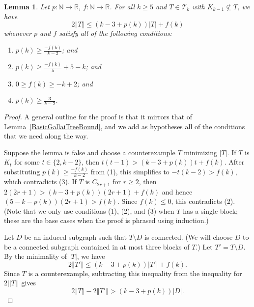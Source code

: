 \documentclass[12pt]{article}
\theoremstyle{plain}
\newtheorem{lem}[thm]{Lemma}
\theoremstyle{definition}
\theoremstyle{remark}
\newcommand{\fancy}[1]{\mathcal{#1}}
\newcommand{\IN}{\mathbb{N}}
\newcommand{\IR}{\mathbb{R}}
\newcommand{\T}{\fancy{T}}
\newcommand{\set}[1]{\left\{ #1 \right\}}
\newcommand{\card}[1]{\left|#1\right|}
\newcommand{\size}[1]{\left\Vert#1\right\Vert}
\newcommand{\func}[3]{#1\colon #2 \rightarrow #3}
\newcommand{\parens}[1]{\left( #1 \right)}
\begin{document}
\begin{lem}\label{BoundFamilyWithoutKKMinusOne}
	Let $\func{p}{\IN}{\IR}$, $\func{f}{\IN}{\IR}$.
	For all $k \ge 5$ and $T \in \T_k$ with $K_{k-1} \not \subseteq T$, we have
	\[2\size{T} \le (k-3 + p(k))\card{T} + f(k)\]
	whenever $p$ and $f$ satisfy all of the following conditions:
	\begin{enumerate}
		\item $p(k) \ge \frac{-f(k)}{k-2}$; and
		\item $p(k) \ge \frac{-f(k)}{5} + 5 - k$; and
		\item $0\ge f(k)\ge -k+2$; and
		\item $p(k) \ge \frac{3}{k-2}$.
	\end{enumerate}
\end{lem}
\begin{proof}
A general outline for the proof is that it mirrors that of
Lemma~\ref{BasicGallaiTreeBound}, and we add as hypotheses all of the conditions that
we need along the way.

Suppose the lemma is false and choose a counterexample $T$ minimizing $|T|$. 
If $T$ is $K_t$ for some $t \in \{2,k-2\}$, then $t(t-1) > (k-3 + p(k))t +
f(k)$.  After substituting $p(k)\ge \frac{-f(k)}{k-2}$ from (1), this
simplifies to $-t(k-2)>f(k)$, which contradicts (3).  If $T$ is $C_{2r+1}$ for
$r \ge 2$, then $2(2r+1) > (k-3 + p(k))(2r+1) + f(k)$ and hence
$(5-k-p(k))(2r+1)>f(k)$.  Since $f(k)\le 0$, this contradicts (2).  (Note that
we only use conditions (1), (2), and (3) when $T$ has a single block;
these are the base cases when the proof is phrased using induction.)

Let $D$ be an %
induced subgraph such that $T\setminus D$ is connected.  (We will choose $D$ to
be a connected subgraph contained in at most three blocks of $T$.)
Let $T' = T \setminus D$. %
By the minimality of $|T|$, we have
	\[2\size{T'} \le (k-3 + p(k))\card{T'} + f(k).\]
	Since $T$ is a counterexample, subtracting this inequality from the inequality for
$2||T||$ gives
	\begin{equation}
	2\size{T} - 2\size{T'} > (k-3 + p(k))|D|. \tag{*}\label{eqn:*}
	\end{equation}
	

\end{proof}
\end{document}
